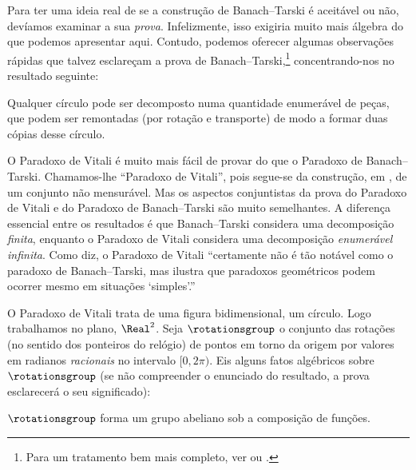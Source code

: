 \documentclass[../../../include/open-logic-section]{subfiles}
\begin{document}

Para ter uma ideia real de se a construção de Banach--Tarski é
aceitável ou não, devíamos examinar a sua \emph{prova}. Infelizmente,
isso exigiria muito mais álgebra do que podemos apresentar aqui.
Contudo, podemos oferecer algumas observações rápidas que talvez esclareçam
a prova de Banach--Tarski,\footnote{Para um tratamento bem mais completo,
ver \cite{Weston2003} ou \cite{Wagon2016}.} concentrando-nos no
resultado seguinte:

\begin{thm}
Qualquer círculo pode ser decomposto numa quantidade enumerável de peças, que podem ser
remontadas (por rotação e transporte) de modo a formar duas cópias desse
círculo.
\end{thm}

O Paradoxo de Vitali é muito mais fácil de provar do que o Paradoxo de Banach--Tarski. Chamamos-lhe ``Paradoxo de Vitali'', pois segue-se da construção, em
\citeyear{Vitali1905}, de um conjunto não mensurável. Mas os
aspectos conjuntistas da prova do Paradoxo de Vitali e do
Paradoxo de Banach--Tarski são muito semelhantes. A diferença essencial
entre os resultados é que Banach--Tarski considera uma
decomposição \emph{finita}, enquanto o Paradoxo de Vitali considera uma
decomposição \emph{enumerável infinita}. Como \citet{Weston2003}
diz, o Paradoxo de Vitali ``certamente não é tão notável como o
paradoxo de Banach--Tarski, mas ilustra que paradoxos geométricos podem
ocorrer mesmo em situações `simples'.'' 

O Paradoxo de Vitali trata de uma figura bidimensional, um círculo. Logo
trabalhamos no plano, $\Real^2$. Seja $\rotationsgroup$ o conjunto das
rotações (no sentido dos ponteiros do relógio) de pontos em torno da origem por valores em radianos \emph{racionais}
no intervalo $[0,2\pi)$. Eis alguns fatos algébricos sobre
$\rotationsgroup$ (se não compreender o enunciado do
resultado, a prova esclarecerá o seu significado):

\begin{lem}
$\rotationsgroup$ forma um {grupo} abeliano sob a composição de funções.
\end{lem}
\end{document}
